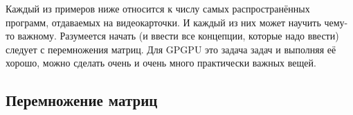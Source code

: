 \documentclass[a4paper,12pt,oneside]{article}
\begin{document}
Каждый из примеров ниже относится к числу самых распространённых программ, отдаваемых на видеокарточки.
И каждый из них может научить чему-то важному.
Разумеется начать (и ввести все концепции, которые надо ввести) следует с перемножения матриц.
Для GPGPU это задача задач и выполняя её хорошо, можно сделать очень и очень много практически важных вещей.

\subsection{Перемножение матриц}\label{subsec:gemm}

\end{document}
